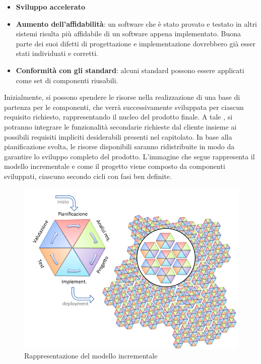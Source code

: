 \begin{itemize}
\begin{itemize}
			\item \textbf{Sviluppo accelerato}
			\item \textbf{Aumento dell'affidabilità}: un software che è stato provato e testato in altri sistemi risulta più affidabile di un software appena implementato.
			Buona parte dei suoi difetti di progettazione e implementazione dovrebbero già esser stati individuati e corretti.
			\item \textbf{Conformità con gli standard}: alcuni standard
			possono essere applicati come set di componenti riusabili.
		\end{itemize}
	\end{itemize}
	Inizialmente, si possono spendere le risorse nella realizzazione di una base di partenza per le componenti, che verrà successivamente sviluppata per ciascun requisito richiesto, rappresentando il nucleo del prodotto finale.
	A tale , si potranno integrare le funzionalità secondarie richieste dal cliente insieme ai possibili requisiti impliciti desiderabili presenti nel capitolato. In base alla pianificazione svolta, le risorse disponibili saranno ridistribuite in modo da garantire lo sviluppo completo del prodotto.
	L'immagine che segue rappresenta il modello incrementale e come il progetto viene composto da componenti sviluppati, ciascuno secondo cicli con fasi ben definite.
	\begin{figure}[H]
		\centering
		\includegraphics[scale=0.5]{img/modello_incrementale.png}
		\caption{Rappresentazione del modello incrementale\protect\footnotemark}
		\label{fig:modello_incrementale}
	\end{figure}

	